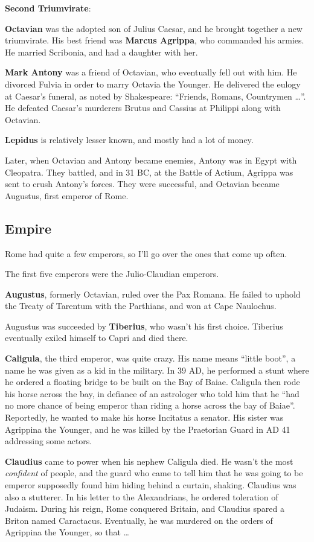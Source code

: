 \textbf{Second Triumvirate}:

\textbf{Octavian} was the adopted son of Julius Caesar, and he brought together a new triumvirate.
His best friend was \textbf{Marcus Agrippa}, who commanded his armies.
He married Scribonia, and had a daughter with her.

\textbf{Mark Antony} was a friend of Octavian, who eventually fell out with him.
He divorced Fulvia in order to marry Octavia the Younger.
He delivered the eulogy at Caesar's funeral, as noted by Shakespeare:
``Friends, Romans, Countrymen \ldots''.
He defeated Caesar's murderers Brutus and Cassius at Philippi along with Octavian.

\textbf{Lepidus} is relatively lesser known, and mostly had a lot of money.

Later, when Octavian and Antony became enemies, Antony was in Egypt with Cleopatra.
They battled, and in 31 BC, at the Battle of Actium, Agrippa was sent to crush Antony's forces.
They were successful, and Octavian became Augustus, first emperor of Rome.

\subsection*{Empire}

Rome had quite a few emperors, so I'll go over the ones that come up often.

The first five emperors were the Julio-Claudian emperors.

\textbf{Augustus}, formerly Octavian, ruled over the Pax Romana.
He failed to uphold the Treaty of Tarentum with the Parthians, and won at Cape Naulochus.

Augustus was succeeded by \textbf{Tiberius}, who wasn't his first choice.
Tiberius eventually exiled himself to Capri and died there.

\textbf{Caligula}, the third emperor, was quite crazy.
His name means ``little boot'', a name he was given as a kid in the military.
In 39 AD, he performed a stunt where he ordered a floating bridge to be built on the Bay of Baiae.
Caligula then rode his horse across the bay, in defiance of an astrologer who told him that he
``had no more chance of being emperor than riding a horse across the bay of Baiae''.
Reportedly, he wanted to make his horse Incitatus a senator.
His sister was Agrippina the Younger, and he was killed by the Praetorian Guard in AD 41 addressing some actors.

\textbf{Claudius} came to power when his nephew Caligula died.
He wasn't the most \textit{confident} of people, and the guard who came to tell
him that he was going to be emperor supposedly found him hiding behind a curtain, shaking.
Claudius was also a stutterer.
In his letter to the Alexandrians, he ordered toleration of Judaism.
During his reign, Rome conquered Britain, and Claudius spared a Briton named Caractacus.
Eventually, he was murdered on the orders of Agrippina the Younger, so that \ldots

